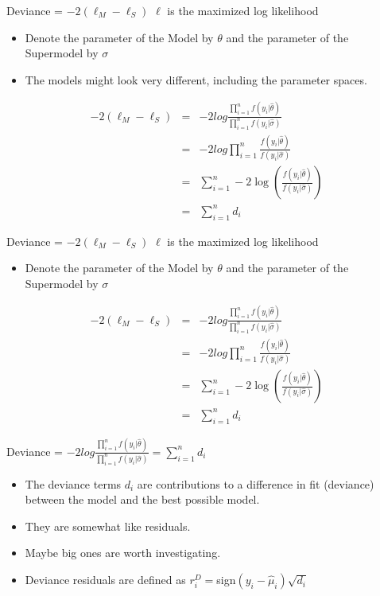 Deviance = $-2(\ell_M-\ell_S)$
$\ell$ is the maximized log likelihood 
\begin{itemize}
	\item Denote the parameter of the Model by $\theta$ and the parameter of the Supermodel by $\sigma$
	\item The models might look very different, including the parameter spaces.
\end{itemize}

\begin{eqnarray*}
	-2(\ell_M-\ell_S) & = & -2log\frac{ \prod_{i=1}^n f(y_i|\widehat{\theta}) }
	{ \prod_{i=1}^n f(y_i|\widehat{\sigma}) }\\
	& = &  -2log \prod_{i=1}^n \frac{f(y_i|\widehat{\theta})}
	{f(y_i|\widehat{\sigma})} \\
	& = & \sum_{i=1}^n -2\log \left(\frac{f(y_i|\widehat{\theta})}
	{f(y_i|\widehat{\sigma})} \right) \\
	& = & \sum_{i=1}^n d_i
\end{eqnarray*} 



Deviance = $-2(\ell_M-\ell_S)$ 
$\ell$ is the maximized log likelihood
\begin{itemize}
	\item Denote the parameter of the Model by $\theta$ and the parameter of the Supermodel by $\sigma$
	
\end{itemize}
\begin{eqnarray*}
	-2(\ell_M-\ell_S) & = & -2log\frac{ \prod_{i=1}^n f(y_i|\widehat{\theta}) }
	{ \prod_{i=1}^n f(y_i|\widehat{\sigma}) }\\
	& = &  -2log \prod_{i=1}^n \frac{f(y_i|\widehat{\theta})}
	{f(y_i|\widehat{\sigma})} \\
	& = & \sum_{i=1}^n -2\log \left(\frac{f(y_i|\widehat{\theta})}
	{f(y_i|\widehat{\sigma})} \right) \\
	& = & \sum_{i=1}^n d_i
\end{eqnarray*} 


Deviance = $-2log\frac{ \prod_{i=1}^n f(y_i|\widehat{\theta}) }
{ \prod_{i=1}^n f(y_i|\widehat{\sigma}) }= {\sum_{i=1}^n d_i}$
\begin{itemize}
	
	\item The deviance terms $d_i$ are contributions to a difference in fit (deviance) between the model and the best possible model.
	\item They are somewhat like residuals.
	\item Maybe big ones are worth investigating.
	\item Deviance residuals are defined as $r^D_i = $sign$(y_i-\widehat{\mu}_i)\sqrt{d_i}$
\end{itemize}
